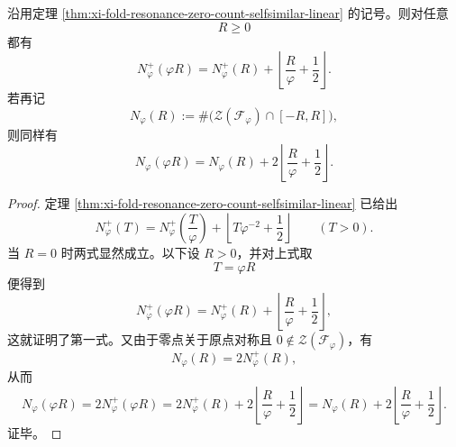 \begin{corollary}\label{cor:xi-fold-resonance-zero-count-forward-update}
沿用定理 \ref{thm:xi-fold-resonance-zero-count-selfsimilar-linear} 的记号。则对任意
\[
R\ge 0
\]
都有
\[
N_\varphi^+(\varphi R)
=
N_\varphi^+(R)
+
\left\lfloor \frac{R}{\varphi}+\frac12\right\rfloor.
\]
若再记
\[
N_\varphi(R):=\#\bigl(\mathcal Z(\mathcal F_\varphi)\cap[-R,R]\bigr),
\]
则同样有
\[
N_\varphi(\varphi R)
=
N_\varphi(R)
+
2\left\lfloor \frac{R}{\varphi}+\frac12\right\rfloor.
\]
\end{corollary}
\begin{proof}
定理 \ref{thm:xi-fold-resonance-zero-count-selfsimilar-linear} 已给出
\[
N_\varphi^+(T)=N_\varphi^+\!\left(\frac{T}{\varphi}\right)+\left\lfloor T\varphi^{-2}+\frac12\right\rfloor
\qquad (T>0).
\]
当 \(R=0\) 时两式显然成立。以下设 \(R>0\)，并对上式取
\[
T=\varphi R
\]
便得到
\[
N_\varphi^+(\varphi R)
=
N_\varphi^+(R)
+
\left\lfloor \frac{R}{\varphi}+\frac12\right\rfloor,
\]
这就证明了第一式。又由于零点关于原点对称且 \(0\notin\mathcal Z(\mathcal F_\varphi)\)，有
\[
N_\varphi(R)=2N_\varphi^+(R),
\]
从而
\[
N_\varphi(\varphi R)
=
2N_\varphi^+(\varphi R)
=
2N_\varphi^+(R)
+
2\left\lfloor \frac{R}{\varphi}+\frac12\right\rfloor
=
N_\varphi(R)
+
2\left\lfloor \frac{R}{\varphi}+\frac12\right\rfloor.
\]
证毕。
\end{proof}

